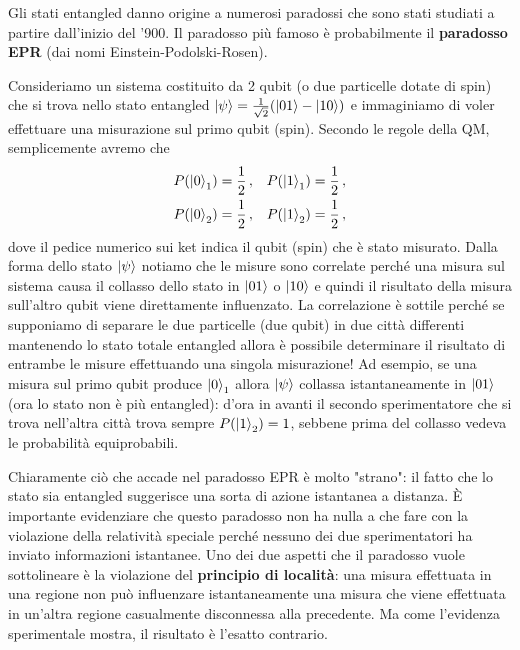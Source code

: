 \noindent Gli stati entangled danno origine a numerosi paradossi che sono stati studiati a partire dall'inizio del '900. Il paradosso più famoso è probabilmente il \textbf{paradosso EPR} (dai nomi Einstein-Podolski-Rosen). 
\begin{esempio}
    Consideriamo un sistema costituito da 2 qubit (o due particelle dotate di spin) che si trova nello stato entangled $\ket{\psi} = \frac{1}{\sqrt{2}} (\ket{01} - \ket{10})$ e immaginiamo di voler effettuare una misurazione sul primo qubit (spin). Secondo le regole della QM, semplicemente avremo che
    \begin{align*}
        P(\ket{0}_1) &= \frac{1}{2} \, , &P(\ket{1}_1) &= \frac{1}{2} \, , \\
        P(\ket{0}_2) &= \frac{1}{2} \, , &P(\ket{1}_2) &= \frac{1}{2} \, ,
    \end{align*}
    dove il pedice numerico sui ket indica il qubit (spin) che è stato misurato. Dalla forma dello stato $\ket{\psi}$ notiamo che le misure sono correlate perché una misura sul sistema causa il collasso dello stato in $\ket{01}$ o $\ket{10}$ e quindi il risultato della misura sull'altro qubit viene direttamente influenzato. La correlazione è sottile perché se supponiamo di separare le due particelle (due qubit) in due città differenti mantenendo lo stato totale entangled allora è possibile determinare il risultato di entrambe le misure effettuando una singola misurazione! Ad esempio, se una misura sul primo qubit produce $\ket{0}_1$ allora $\ket{\psi}$ collassa istantaneamente in $\ket{01}$ (ora lo stato non è più entangled): d'ora in avanti il secondo sperimentatore che si trova nell'altra città trova sempre $P(\ket{1}_2) = 1$, sebbene prima del collasso vedeva le probabilità equiprobabili.
\end{esempio}

\noindent Chiaramente ciò che accade nel paradosso EPR è molto "strano": il fatto che lo stato sia entangled suggerisce una sorta di azione istantanea a distanza. È importante evidenziare che questo paradosso non ha nulla a che fare con la violazione della relatività speciale perché nessuno dei due sperimentatori ha inviato informazioni istantanee. Uno dei due aspetti che il paradosso vuole sottolineare è la violazione del \textbf{principio di località}: una misura effettuata in una regione non può influenzare istantaneamente una misura che viene effettuata in un'altra regione casualmente disconnessa alla precedente. Ma come l'evidenza sperimentale mostra, il risultato è l'esatto contrario.

